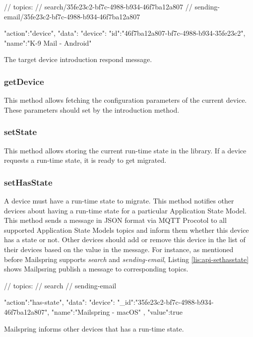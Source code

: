 \FloatBarrier
\begin{code}
\begin{js2}
// topics:
// search/35fe23c2-bf7c-4988-b934-46f7ba12a807
// sending-email/35fe23c2-bf7c-4988-b934-46f7ba12a807
\end{js2}

\begin{json}
{
   "action":"device",
   "data":{
      "device":{
         "id":"46f7ba12a807-bf7c-4988-b934-35fe23c2",
         "name":"K-9 Mail - Android"
      }
   }
}
\end{json}
\caption{The target device introduction respond message.}
\label{lis:api-introduction-target}
\end{code}
\FloatBarrier


\subsubsection{getDevice}
This method allows fetching the configuration parameters of the current device. These parameters should set by the introduction method.

\subsubsection{setState}
This method allows storing the current run-time state in the library. If a  device requests a run-time state, it is ready to get migrated. 

\subsubsection{setHasState}
A device must have a run-time state to migrate. This method notifies other devices about having a run-time state for a particular Application State Model. This method sends a message in JSON format via MQTT Procotol to all supported Application State Models topics and inform them whether this device has a state or not. Other devices should add or remove this device in the list of their devices based on the value in the message. For instance, as mentioned before Mailspring supports \textit{search} and \textit{sending-email}, Listing \ref{lis:api-sethasstate} shows Mailpsring publish a message to corresponding topics.


\FloatBarrier
\begin{code}
\begin{js2}
// topics:
// search
// sending-email
\end{js2}

\begin{json}
{
   "action":"has-state",
   "data":{
      "device":{
         "_id":"35fe23c2-bf7c-4988-b934-46f7ba12a807",
         "name":"Mailspring - macOS"
      },
      "value":true
   }
}
\end{json}
\caption{Mailspring informs other devices that has a run-time state.}
\label{lis:api-sethasstate}
\end{code}
\FloatBarrier


